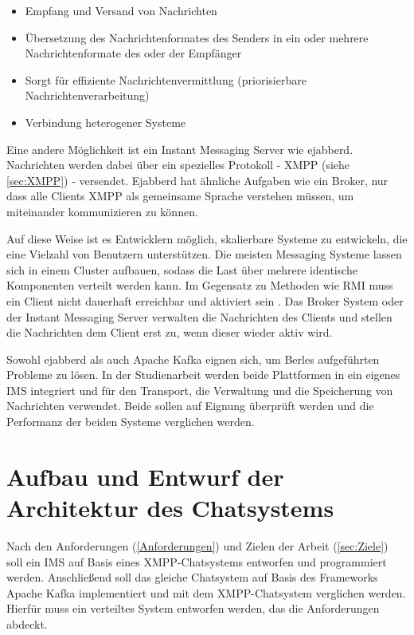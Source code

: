 \documentclass[a4paper,titlepage,halfparskip,12pt]{scrreprt}
\begin{document}
\begin{onehalfspacing}
\begin{itemize}
\item Empfang und Versand von Nachrichten
\item Übersetzung des Nachrichtenformates des Senders in ein oder mehrere Nachrichtenformate des oder der Empfänger
\item Sorgt für effiziente Nachrichtenvermittlung (priorisierbare Nachrichtenverarbeitung)
\item Verbindung heterogener Systeme
\end{itemize}

Eine andere Möglichkeit ist ein Instant Messaging Server wie ejabberd. Nachrichten werden dabei über ein spezielles Protokoll - \ac{XMPP} (siehe \autoref{sec:XMPP}) - versendet. Ejabberd hat ähnliche Aufgaben wie ein Broker, nur dass alle Clients \acs{XMPP} als gemeinsame Sprache verstehen müssen, um miteinander kommunizieren zu können.

Auf diese Weise ist es Entwicklern möglich, skalierbare Systeme zu entwickeln, die eine Vielzahl von Benutzern unterstützen. Die meisten Messaging Systeme lassen sich in einem Cluster aufbauen, sodass die Last über mehrere identische Komponenten verteilt werden kann. Im Gegensatz zu Methoden wie \ac{RMI} muss ein Client nicht dauerhaft erreichbar und aktiviert sein \cite{andrew2008verteilte}. Das Broker System oder der Instant Messaging Server verwalten die Nachrichten des Clients und stellen die Nachrichten dem Client erst zu, wenn dieser wieder aktiv wird.

Sowohl ejabberd als auch Apache Kafka eignen sich, um Berles aufgeführten Probleme zu lösen. In der Studienarbeit werden beide Plattformen in ein eigenes \ac{IMS} integriert und für den Transport, die Verwaltung und die Speicherung von Nachrichten verwendet. Beide sollen auf Eignung überprüft werden und die Performanz der beiden Systeme verglichen werden.

\pagebreak


\section{Aufbau und Entwurf der Architektur des Chatsystems}
\label{sec:Architektur}

Nach den Anforderungen (\autoref{Anforderungen}) und Zielen der Arbeit (\autoref{sec:Ziele}) soll ein \ac{IMS} auf Basis eines \ac{XMPP}-Chatsystems entworfen und programmiert werden. Anschließend soll das gleiche Chatsystem auf Basis des Frameworks Apache Kafka implementiert und mit dem \ac{XMPP}-Chatsystem verglichen werden. Hierfür muss ein verteiltes System entworfen werden, das die Anforderungen abdeckt.


\end{onehalfspacing}
\end{document}
